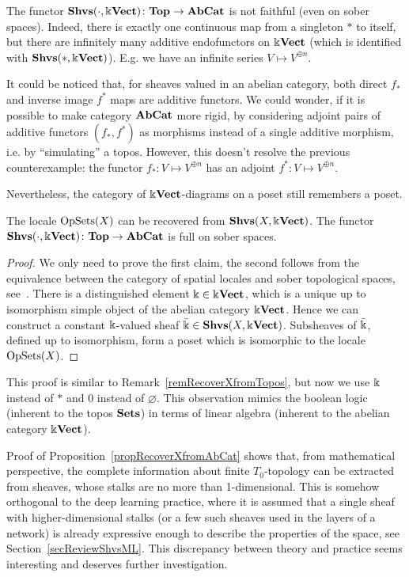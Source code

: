 \begin{rem}\label{remToAbCatNotFaithful}
The functor $\mathbf{Shvs}(\cdot,\Bbbk\mathbf{Vect})\colon \mathbf{Top}\to\mathbf{AbCat}$ is not faithful (even on sober spaces). Indeed, there is exactly one continuous map from a singleton $\ast$ to itself, but there are infinitely many additive endofunctors on $\Bbbk\mathbf{Vect}$ (which is identified with $\mathbf{Shvs}(\ast,\Bbbk\mathbf{Vect})$). E.g. we have an infinite series $V\mapsto V^{\oplus n}$.

It could be noticed that, for sheaves valued in an abelian category, both direct $f_*$ and inverse image $f^*$ maps are additive functors. We could wonder, if it is possible to make category $\mathbf{AbCat}$ more rigid, by considering adjoint pairs of additive functors $(f_*,f^*)$ as morphisms instead of a single additive morphism, i.e. by ``simulating'' a topos. However, this doesn't resolve the previous counterexample: the functor $f_*\colon V\mapsto V^{\oplus n}$ has an adjoint $f^*\colon V\mapsto V^{\oplus n}$.
\end{rem}

Nevertheless, the category of $\Bbbk\mathbf{Vect}$-diagrams on a poset still remembers a poset. 

\begin{prop}\label{propRecoverXfromAbCat}
The locale $\operatorname{OpSets}(X)$ can be recovered from $\mathbf{Shvs}(X,\Bbbk\mathbf{Vect})$. The functor $\mathbf{Shvs}(\cdot,\Bbbk\mathbf{Vect})\colon \mathbf{Top}\to\mathbf{AbCat}$ is full on sober spaces.
\end{prop}

\begin{proof}
We only need to prove the first claim, the second follows from the equivalence between the category of spatial locales and sober topological spaces, see~\cite[Cor.4,p.481]{MacLaneMoerdijk}. There is a distinguished element $\Bbbk\in\Bbbk\mathbf{Vect}$, which is a unique up to isomorphism simple object of the abelian category $\Bbbk\mathbf{Vect}$. Hence we can construct a constant $\Bbbk$-valued sheaf $\bar{\Bbbk}\in\mathbf{Shvs}(X,\Bbbk\mathbf{Vect})$. Subsheaves of $\bar{\Bbbk}$, defined up to isomorphism, form a poset which is isomorphic to the locale $\operatorname{OpSets}(X)$.
\end{proof}

This proof is similar to Remark~\ref{remRecoverXfromTopos}, but now we use $\Bbbk$ instead of $\ast$ and $0$ instead of $\varnothing$. This observation mimics the boolean logic (inherent to the topos $\mathbf{Sets}$) in terms of linear algebra (inherent to the abelian category $\Bbbk\mathbf{Vect}$).

\begin{rem}\label{remTheoryIs1dimStrange}
Proof of Proposition~\ref{propRecoverXfromAbCat} shows that, from mathematical perspective, the complete information about finite $T_0$-topology can be extracted from sheaves, whose stalks are no more than 1-dimensional. This is somehow orthogonal to the deep learning practice, where it is assumed that a single sheaf with higher-dimensional stalks (or a few such sheaves used in the layers of a network) is already expressive enough to describe the properties of the space, see Section~\ref{secReviewShvsML}. This discrepancy between theory and practice seems interesting and deserves further investigation.
\end{rem}

